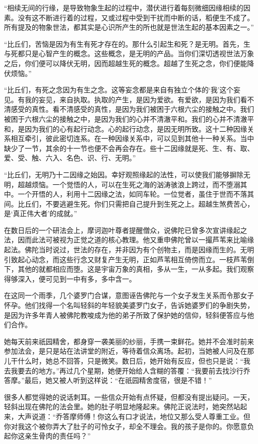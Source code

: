 \documentclass[12pt,twoside,openany]{book}
\begin{document}
“相续无间的行缘，是导致物象生起的过程中，潜伏进行着每刻微细因缘相续的因素。没有这不断进行着的过程，又或过程中受到干扰而中断的话，稻便生不成了。所有提及的物象世法，都其实是心识所产生的所也就是世法生起的基本因素之一。”

“比丘们，苦恼是因为有生有死才存在的。那什么引起生和死？是无明。首先，生与死都只是心智产生的概念。这些概念，是无明的产品。当你们深切透视世法万象之后，你们便可以降伏无明，因而超越生死的概念。超越了生死之念，你们便能降伏烦恼。”

“比丘们，有死之念因为有生之念。这等妄念都是来自有独立个体的‘我’这个妄见。有我的妄见，来自执取。执取的产生，是因为爱欲。有爱欲，是因为我们看不清感受的真性。看不清感受的真性，是因为我们被困于六根六尘的接触之中。我们被困于六根六尘的接触之中，是因为我们的心并不清澈平和。我们的心并不清澈平和，是因为我们的心有起行动念。心的起行动念，是因无明所致。这十二种因缘关系相互牵引，彼此密切连系。在一种因缘关系中，可以见到其他十一种关系。当中缺少了一节，其余的十一节也便不会再会存在。些十二因缘就是死、生、有、取、爱、受、触、六入、名色、识、行、无明。”

“比丘们，无明乃十二因缘之始因。幸好观照缘起的法性，可以使我们能够摒除无明，超越烦恼。一个觉悟的人，可以在生死之海的汹涛骇浪上跨过，而不堕溺其中。一个开悟的人，利用十二因缘之法，如同车轮。一位觉者，虽住于世而不落其间。比丘们，不要逃避生死。你们只需把自己提升到生死之上。超越生煞费苦心，是‘真正伟大者’的成就。”

在数日后的一个研法会上，摩诃迦叶尊者提醒僧众，说佛陀已曾多次宣讲缘起之法，因而此法可被视为正觉之道的核心教理。他又重申佛陀曾以一撮芦苇来比喻缘起法。佛陀当时说过，世法的存在，并非因为有个创物主，而是因缘而生的。无明引致起心动念，而这些行念又财复产生无明，正如芦苇相互倚傍而立。一枝芦苇倒下，其他的就都相应而堕。这是宇宙万象的真相，多从一生，一从多起。我们观察得够深入，便可见到一中有多，多中含一。

在这同一个雨季，几个婆罗门合谋，意图诬告佛陀与一个女子发生关系而令那女子怀孕。他们找得一个名叫轻斜的年轻貌美婆罗门女子，告诉她婆罗们的争剧失势，是因为许多年青人被佛陀教唆成为他的弟子所致了保护她的信仰，轻斜便答应与他们合作。

她每天前来祇园精舍，都身穿一袭美丽的纱丽，手携一束鲜花。她并不会准时前来参加法会，是只是站在法讲堂的附近，等待着信众离场。起初，当她被人问及在那儿干什么时，她总不回答，只是微笑。数日后，她开始有反应，但也只是说：“我去我要去的地方。”再过几个星期，她便开始给人含糊的答覆：“我要前去找沙行乔答摩。”最后，她又被人听到这样说：“在祇园精舍度宿，很是不错！”

很多人都觉得她的说话刺耳。一些信众开始有点怀疑，但都没有提出疑问。一天，轻斜出现在佛陀的法会里。她的肚子明显地隆起来。佛陀正说法时，她突然站起来，大声说道：“乔答摩师傅！你这么有口才说法，地位又那么受人尊重工业。但你对我这个被你弄大了肚子的可怜女子，却全不理会。我的孩子是你的。你愿意负起你这亲生骨肉的责任吗？”
\end{document}
